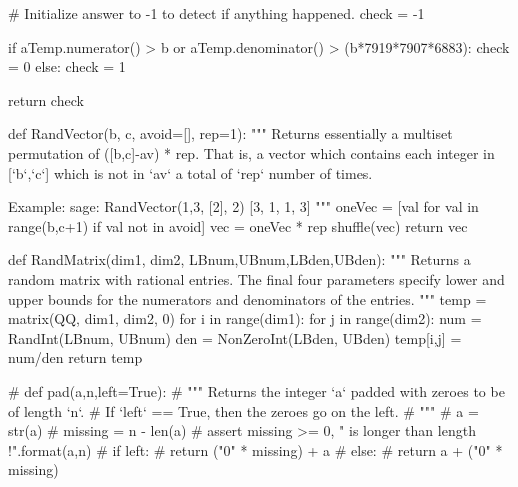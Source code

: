 \begin{sagesilent}
    # Initialize answer to -1 to detect if anything happened.
    check = -1
    
    if aTemp.numerator() > b or aTemp.denominator() > (b*7919*7907*6883):
        check = 0
    else:
        check = 1
    
    return check

def RandVector(b, c, avoid=[], rep=1):
    """ Returns essentially a multiset permutation of ([b,c]-av) * rep.
        That is, a vector which contains each integer in [`b`,`c`] which is not in `av` a total of `rep` number of times.

        Example:
        sage: RandVector(1,3, [2], 2)
        [3, 1, 1, 3]
    """
    oneVec = [val for val in range(b,c+1) if val not in avoid]
    vec = oneVec * rep
    shuffle(vec)
    return vec

def RandMatrix(dim1, dim2, LBnum,UBnum,LBden,UBden):
    """ Returns a random matrix with rational entries. 
        The final four parameters specify lower and upper bounds for the 
        numerators and denominators of the entries.
    """
    temp = matrix(QQ, dim1, dim2, 0)
    for i in range(dim1):
        for j in range(dim2):
            num = RandInt(LBnum, UBnum)
            den = NonZeroInt(LBden, UBden)
            temp[i,j] = num/den
    return temp

# def pad(a,n,left=True):
#   """ Returns the integer `a` padded with zeroes to be of length `n`.
#       If `left` == True, then the zeroes go on the left.
#   """
#   a = str(a)
#   missing = n - len(a) 
#   assert missing >= 0, "{} is longer than length {}!".format(a,n)
#   if left:
#       return ("0" * missing) + a
#   else:
#       return a + ("0" * missing)

\end{sagesilent}